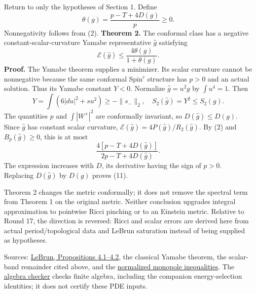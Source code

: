 \documentclass[
  11pt,
]{article}
\begin{document}
Return to only the hypotheses of Section 1. Define \[
 \theta(g)=\frac{p-T+4D(g)}p\ge0.
 \tag{10}
\] Nonnegativity follows from (2). \textbf{Theorem 2.} The conformal
class has a negative constant-scalar-curvature Yamabe representative
\(\widehat g\) satisfying \[
 \boxed{\mathcal E(\widehat g)
       \le\frac{4\theta(g)}{1+\theta(g)}.}
 \tag{11}
\] \textbf{Proof.} The Yamabe theorem supplies a minimizer. Its scalar
curvature cannot be nonnegative because the same conformal Spin\(^c\)
structure has \(p>0\) and an actual solution. Thus its Yamabe constant
\(Y<0\). Normalize \(\widehat g=u^2g\) by \(\int u^4=1\). Then \[
 Y=\int(6|du|^2+su^2)\ge-\|s_-\|_2,
 \quad S_2(\widehat g)=Y^2\le S_2(g).
 \tag{12}
\] The quantities \(p\) and \(\int|W^+|^2\) are conformally invariant,
so \(D(\widehat g)\le D(g)\). Since \(\widehat g\) has constant scalar
curvature, \(\mathcal E(\widehat g)=4P(\widehat g)/R_2(\widehat g)\). By
(2) and \(B_p(\widehat g)\ge0\), this is at most \[
 \frac{4[p-T+4D(\widehat g)]}{2p-T+4D(\widehat g)}.
\] The expression increases with \(D\), its derivative having the sign
of \(p>0\). Replacing \(D(\widehat g)\) by \(D(g)\) proves (11).

Theorem 2 changes the metric conformally; it does not remove the
spectral term from Theorem 1 on the original metric. Neither conclusion
upgrades integral approximation to pointwise Ricci pinching or to an
Einstein metric. Relative to Round 17, the direction is reversed: Ricci
and scalar errors are derived here from actual period/topological data
and LeBrun saturation instead of being supplied as hypotheses.

Sources: \href{https://arxiv.org/abs/math/0003068}{LeBrun, Propositions
4.1--4.2}, the classical Yamabe theorem, the scalar-band remainder cited
above, and the \href{round3_monopole_input.md}{normalized monopole
inequalities}. The \href{line1_ricci_remainder_check.py}{algebra
checker} checks finite algebra, including the companion energy-selection
identities; it does not certify these PDE inputs.
\end{document}
